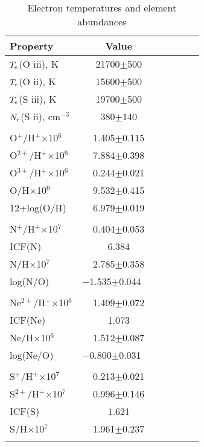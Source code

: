 \begin{table}
\caption{Electron temperatures and element abundances \label{tab3}}
\begin{tabular}{lccccc} \hline
Property                             &Value          \\ \hline
$T_{\rm e}$(O {\sc iii}), K          &21700$\pm$500       \\
$T_{\rm e}$(O {\sc ii}), K           &15600$\pm$500       \\
$T_{\rm e}$(S {\sc iii}), K          &19700$\pm$500       \\
$N_{\rm e}$(S {\sc ii}), cm$^{-3}$    &380$\pm$140         \\ \\
O$^+$/H$^+$$\times$10$^6$            &1.405$\pm$0.115 \\
O$^{2+}$/H$^+$$\times$10$^6$          &7.884$\pm$0.398 \\
O$^{3+}$/H$^+$$\times$10$^6$          &0.244$\pm$0.021 \\
O/H$\times$10$^6$                   &9.532$\pm$0.415 \\
12+log(O/H)                         &6.979$\pm$0.019     \\ \\
N$^+$/H$^+$$\times$10$^7$            &0.404$\pm$0.053 \\
ICF(N)                              &6.384 \\
N/H$\times$10$^7$                   &2.785$\pm$0.358 \\
log(N/O)                            &$-$1.535$\pm$0.044~~~\\ \\
Ne$^{2+}$/H$^+$$\times$10$^6$        &1.409$\pm$0.072 \\
ICF(Ne)                             &1.073 \\
Ne/H$\times$10$^6$                  &1.512$\pm$0.087 \\
log(Ne/O)                           &$-$0.800$\pm$0.031~~~\\ \\
S$^+$/H$^+$$\times$10$^7$            &0.213$\pm$0.021 \\
S$^{2+}$/H$^+$$\times$10$^7$         &0.996$\pm$0.146 \\
ICF(S)                              &1.621 \\
S/H$\times$10$^7$                   &1.961$\pm$0.237 \\
$$
\end{tabular}
\end{table}
